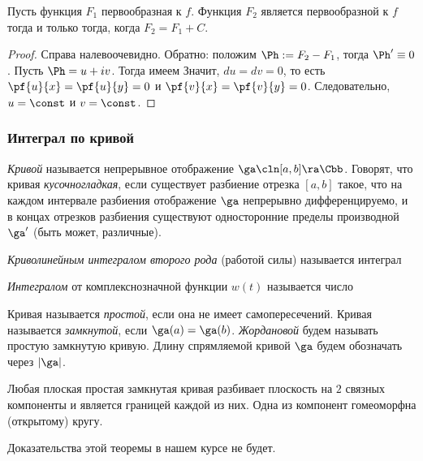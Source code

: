 \documentclass[a4paper]{article}
\begin{document}
\begin{lemma}
Пусть функция $F_1$ \т первообразная к $f$. Функция $F_2$ является первообразной
к $f$ тогда и только тогда, когда $F_2=F_1+C$.
\end{lemma}
\begin{proof}
Справа налево\т очевидно. Обратно: положим $\Ph := F_2-F_1$, тогда $\Ph' \equiv 0$.
Пусть $\Ph = u+iv$. Тогда имеем
Значит, $du = dv=0$, то есть $\pf{u}{x} = \pf{u}{y} =0$ и $\pf{v}{x}=\pf{v}{y}=0$. Следовательно, $u=\const$ и $v=\const$.
\end{proof}

\subsubsection{Интеграл по кривой}

\begin{df}
\emph{Кривой} называется непрерывное отображение $\ga\cln [a,b]\ra \Cbb$.
Говорят, что кривая \emph{кусочно\д гладкая}, если существует разбиение отрезка $[a,b]$ такое, что на каждом
интервале разбиения отображение $\ga$ непрерывно дифференцируемо, и в концах отрезков разбиения
существуют односторонние пределы производной~$\ga'$ (быть может, различные).
\end{df}

\begin{df}
\emph{Криволинейным интегралом второго рода} (работой силы) называется интеграл
\end{df}

\begin{df}
\emph{Интегралом} от комплекснозначной функции $w(t)$ называется число
\end{df}

\begin{df}
Кривая называется \emph{простой}, если она не имеет самопересечений. Кривая называется \emph{замкнутой}, если
$\ga(a)=\ga(b)$. \emph{Жордановой} будем называть простую замкнутую кривую. Длину спрямляемой кривой $\ga$ будем
обозначать через $|\ga|$.
\end{df}

\begin{theorem}[Жордана]
Любая плоская простая замкнутая кривая разбивает плоскость на $2$ связных компоненты и является границей каждой
из них. Одна из компонент гомеоморфна (открытому) кругу.
\end{theorem}
Доказательства этой теоремы в нашем курсе не будет.
\end{document}

